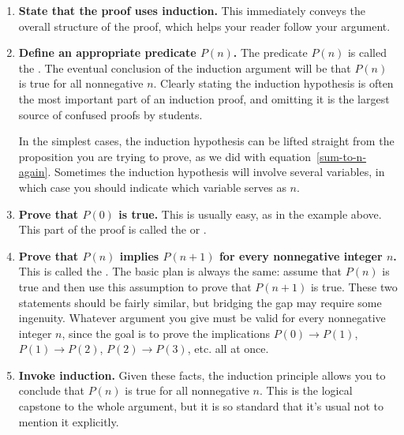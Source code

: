 \begin{enumerate}

\item \textbf{State that the proof uses induction.}  This immediately
  conveys the overall structure of the proof, which helps your reader
  follow your argument.

\item \textbf{Define an appropriate predicate $P(n)$.}  The predicate $P(n)$ is 
called the .  The eventual conclusion of
the induction argument will be that $P(n)$ is true for all nonnegative
$n$.  Clearly stating the induction hypothesis is often the most
important part of an induction proof, and omitting it is the largest
source of confused proofs by students.

In the simplest cases, the induction hypothesis can be lifted straight
from the proposition you are trying to prove, as we did with
equation~\eqref{sum-to-n-again}.  Sometimes the induction hypothesis
will involve several variables, in which case you should indicate
which variable serves as $n$.

\item \textbf{Prove that $P(0)$ is true.}  This is usually easy, as in the
  example above.  This part of the proof is called the 
  or .\iffalse
  (Sometimes the base case will be $n=1$ or even
  some larger number, in which case the starting value of $n$ also should
  be stated.)\fi

\item \textbf{Prove that $P(n)$ implies $P(n+1)$ for every nonnegative
    integer $n$.}  This is called the .  The basic
  plan is always the same: assume that $P(n)$ is true and then use this
  assumption to prove that $P(n+1)$ is true.  These two statements should
  be fairly similar, but bridging the gap may require some ingenuity.
  Whatever argument you give must be valid for every nonnegative integer
  $n$, since the goal is to prove the implications $P(0) \rightarrow
  P(1)$, $P(1) \rightarrow P(2)$, $P(2) \rightarrow P(3)$, etc. all at
  once.

\item \textbf{Invoke induction.}  Given these facts, the induction
  principle allows you to conclude that $P(n)$ is true for all nonnegative
  $n$.  This is the logical capstone to the whole argument, but it is so
  standard that it's usual not to mention it explicitly.

\end{enumerate}

